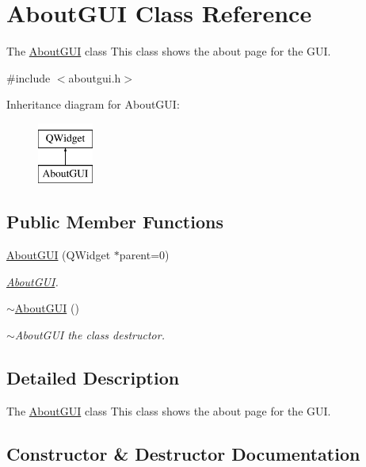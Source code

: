 \hypertarget{classAboutGUI}{}\section{About\+G\+UI Class Reference}
\label{classAboutGUI}


The \hyperlink{classAboutGUI}{About\+G\+UI} class This class shows the about page for the G\+UI.  




{\ttfamily \#include $<$aboutgui.\+h$>$}

Inheritance diagram for About\+G\+UI\+:\begin{figure}[H]
\begin{center}
\leavevmode
\includegraphics[height=2.000000cm]{classAboutGUI}
\end{center}
\end{figure}
\subsection*{Public Member Functions}
\begin{DoxyCompactItemize}
\item 
\hyperlink{classAboutGUI_a5e20eeaf15b393f31864e1817598656c}{About\+G\+UI} (Q\+Widget $\ast$parent=0)
\begin{DoxyCompactList}\small\item\em \hyperlink{classAboutGUI}{About\+G\+UI}. \end{DoxyCompactList}\item 
\hyperlink{classAboutGUI_a95782335655fa2f1085aec49fedd8b05}{$\sim$\+About\+G\+UI} ()
\begin{DoxyCompactList}\small\item\em $\sim$\+About\+G\+UI the class destructor. \end{DoxyCompactList}\end{DoxyCompactItemize}


\subsection{Detailed Description}
The \hyperlink{classAboutGUI}{About\+G\+UI} class This class shows the about page for the G\+UI. 

\subsection{Constructor \& Destructor Documentation}
